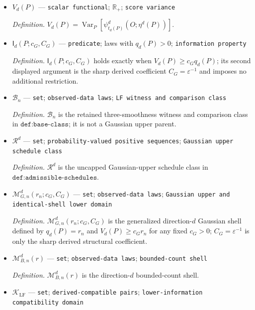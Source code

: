 \documentclass{article}
\begin{document}
\begin{itemize}
  \par\smallskip\noindent\emph{Definition.} \(\psi_t^d\) is the direction-\(d\) score in \texttt{def:scores} with the row index suppressed.
  \item \(V_d(P)\) --- \texttt{scalar functional}; \(\mathbb R_+\); \texttt{score variance}
  \par\smallskip\noindent\emph{Definition.} \(V_d(P)=\operatorname{Var}_P[\psi^d_{t_d(P)}(O;\eta^d(P))]\).
  \item \(\mathsf I_d(P;c_G,C_G)\) --- \texttt{predicate}; laws with \(q_d(P)>0\); \texttt{information property}
  \par\smallskip\noindent\emph{Definition.} \(\mathsf I_d(P;c_G,C_G)\) holds exactly when \(V_d(P)\ge c_Gq_d(P)\); its second displayed argument is the sharp derived coefficient \(C_G=\varepsilon^{-1}\) and imposes no additional restriction.
  \item \(\mathcal B_n\) --- \texttt{set}; \texttt{observed-\allowbreak{}data laws}; \texttt{LF witness and comparison class}
  \par\smallskip\noindent\emph{Definition.} \(\mathcal B_n\) is the retained three-smoothness witness and comparison class in \(\texttt{def:base-class}\); it is not a Gaussian upper parent.
  \item \(\mathcal R^d\) --- \texttt{set}; \texttt{probability-\allowbreak{}valued positive sequences}; \texttt{Gaussian upper schedule class}
  \par\smallskip\noindent\emph{Definition.} \(\mathcal R^d\) is the uncapped Gaussian-upper schedule class in \(\texttt{def:admissible-schedules}\).
  \item \(\mathcal M_{G,n}^d(r_n;c_G,C_G)\) --- \texttt{set}; \texttt{observed-\allowbreak{}data laws}; \texttt{Gaussian upper and identical-\allowbreak{}shell lower domain}
  \par\smallskip\noindent\emph{Definition.} \(\mathcal M_{G,n}^d(r_n;c_G,C_G)\) is the generalized direction-\(d\) Gaussian shell defined by \(q_d(P)=r_n\) and \(V_d(P)\ge c_Gr_n\) for any fixed \(c_G>0\); \(C_G=\varepsilon^{-1}\) is only the sharp derived structural coefficient.
  \item \(\mathcal M_{B,n}^d(r)\) --- \texttt{set}; \texttt{observed-\allowbreak{}data laws}; \texttt{bounded-\allowbreak{}count shell}
  \par\smallskip\noindent\emph{Definition.} \(\mathcal M_{B,n}^d(r)\) is the direction-\(d\) bounded-count shell.
  \item \(\mathcal K_{\mathrm{LF}}\) --- \texttt{set}; \texttt{derived-\allowbreak{}compatible pairs}; \texttt{lower-\allowbreak{}information compatibility domain}

\end{itemize}
\end{document}
